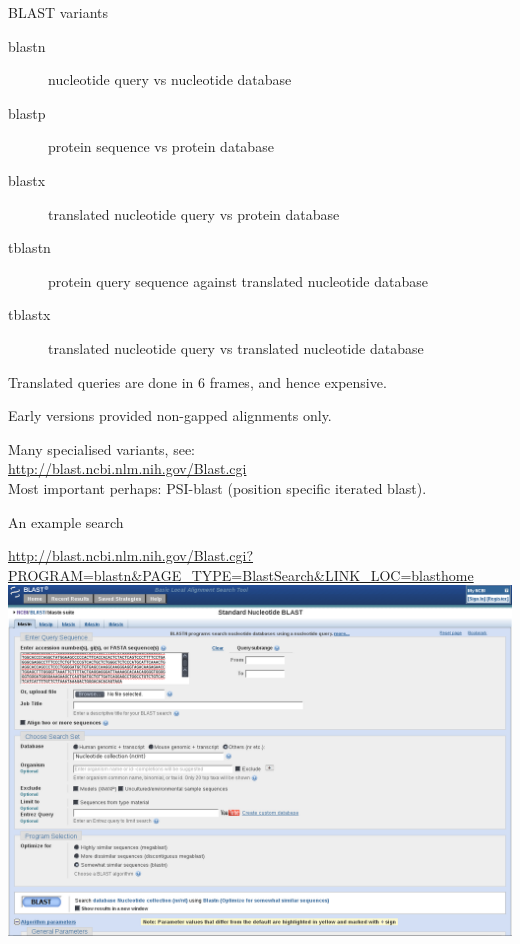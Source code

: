 \documentclass[pdf]{beamer}
\begin{document}
\begin{frame}{BLAST variants}
  \begin{description}
  \item[blastn] nucleotide query vs nucleotide database
  \item[blastp] protein sequence vs protein database
  \item[blastx] translated nucleotide query vs protein database
  \item[tblastn] protein query sequence against translated nucleotide database
  \item[tblastx] translated nucleotide query vs translated nucleotide database
  \end{description}
  
  Translated queries are done in 6 frames, and hence expensive.

  Early versions provided non-gapped alignments only.

  Many specialised variants, see:\\
  \url{http://blast.ncbi.nlm.nih.gov/Blast.cgi}\\
  Most important perhaps: PSI-blast (position specific iterated blast).
\end{frame}

\begin{frame}{An example search}

  {\tiny
  \url{http://blast.ncbi.nlm.nih.gov/Blast.cgi?PROGRAM=blastn&PAGE\_TYPE=BlastSearch&LINK\_LOC=blasthome}
  }
  \includegraphics[width=\textwidth]{images/blast_input.png}
\end{frame}
\end{document}
